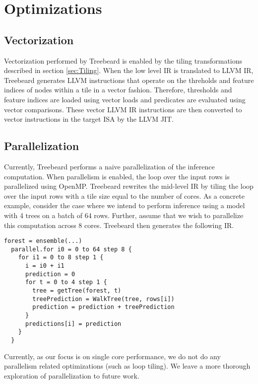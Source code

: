 \section{Optimizations}






\subsection{Vectorization}
Vectorization performed by Treebeard is enabled by the tiling transformations described in section \ref{sec:Tiling}. 
When the low level IR is translated to LLVM IR, Treebeard generates LLVM instructions that operate on the threholds and feature indices 
of nodes within a tile in a vector fashion. Therefore, thresholds and feature indices are loaded using vector loads and predicates are 
evaluated using vector comparisons. These vector LLVM IR instructions are then converted to vector instructions in the target ISA by 
the LLVM JIT.

\subsection{Parallelization}
Currently, Treebeard performs a naive parallelization of the inference computation. When parallelism is enabled, the 
loop over the input rows is parallelized using OpenMP. Treebeard rewrites 
the mid-level IR by tiling the loop over the input rows with a tile size equal to the number of cores. 
As a concrete example, consider the case where we intend to perform inference using a model with 4 trees 
on a batch of 64 rows. Further, assume that we wish to parallelize this computation across 8 cores. 
Treebeard then generates the following IR.
\begin{lstlisting}[style=c++]
  forest = ensemble(...)
  parallel.for i0 = 0 to 64 step 8 {
    for i1 = 0 to 8 step 1 {
      i = i0 + i1
      prediction = 0
      for t = 0 to 4 step 1 {
        tree = getTree(forest, t) 
        treePrediction = WalkTree(tree, rows[i])
        prediction = prediction + treePrediction
      }
      predictions[i] = prediction
    }
  }
\end{lstlisting}
Currently, as our focus is on single core performance, we do not 
do any parallelism related optimizations (such as loop tiling). We leave a more thorough exploration of parallelization 
to future work.